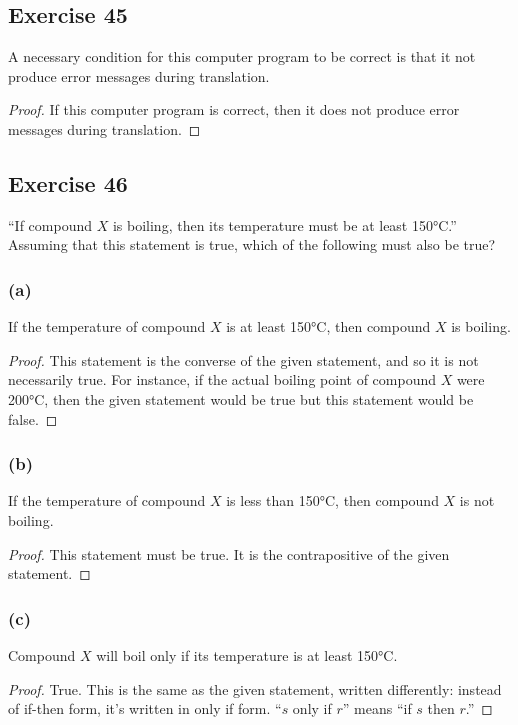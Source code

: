 \documentclass[14pt]{extarticle}
\begin{document}
\subsection{Exercise 45} A necessary condition for this computer program to be
correct is that it not produce error messages during translation.

\begin{proof} If this computer program is correct, then it does not produce
error messages during translation. \end{proof}

\subsection{Exercise 46} “If compound $X$ is boiling, then its temperature must
be at least 150°C.” Assuming that this statement is true, which of the following
must also be true?

\subsubsection{(a)} If the temperature of compound $X$ is at least 150°C, then
compound $X$ is boiling.

\begin{proof} This statement is the converse of the given statement, and so it
is not necessarily true. For instance, if the actual boiling point of compound
$X$ were 200°C, then the given statement would be true but this statement would
be false. \end{proof}

\subsubsection{(b)} If the temperature of compound $X$ is less than 150°C, then
compound $X$ is not boiling.

\begin{proof} This statement must be true. It is the contrapositive of the given
statement. \end{proof}

\subsubsection{(c)} Compound $X$ will boil only if its temperature is at least
150°C.

\begin{proof} True. This is the same as the given statement, written
differently: instead of if-then form, it's written in only if form. ``$s$ only
if $r$'' means ``if $s$ then $r$.'' \end{proof}
\end{document}
